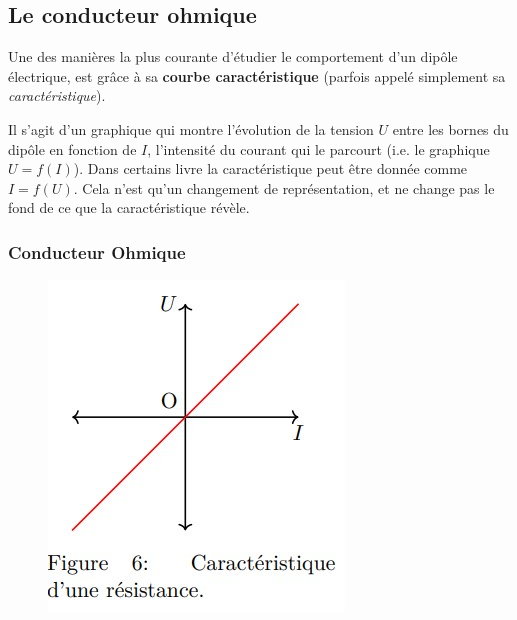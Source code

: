 \documentclass[11pt,a4paper]{article}
\begin{document}
\subsection{Le conducteur ohmique}

Une des manières la plus courante d'étudier le comportement d'un dipôle électrique, est grâce à sa \textbf{courbe caractéristique}  (parfois appelé simplement sa \textit{caractéristique}). 

Il s'agit d'un graphique qui montre l'évolution de la tension $U$ entre les bornes du dipôle en fonction de $I$, l'intensité du courant qui le parcourt (i.e. le graphique $U=f(I)$). Dans certains livre la caractéristique peut être donnée comme $I=f(U)$. Cela n'est qu'un changement de représentation, et ne change pas le fond de ce que la caractéristique révèle. 


\subsubsection*{Conducteur Ohmique}

\begingroup
\setlength{\intextsep}{1pt}%
\begin{figure}
\centering
    \includegraphics[width=0.95\linewidth]{imgs/p7/car1.jpg}
\end{figure}
\end{document}
